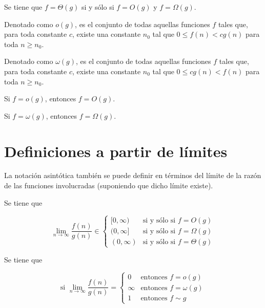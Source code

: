\begin{prop}
    Se tiene que $f=\Theta(g)$ si y sólo si $f=O(g)$ y $f=\Omega(g)$.
\end{prop}

\begin{defn}[o chica]
    Denotado como $o(g)$, es el conjunto de todas aquellas funciones
    $f$ tales que, para toda constante $c$, existe una constante $n_{0}$
    tal que $0\leq f(n)<c g(n)$ para toda $n\geq n_{0}$.
\end{defn}

\begin{defn}
    Denotado como $\omega(g)$, es el conjunto de todas aquellas funciones
    $f$ tales que, para toda constante $c$, existe una constante $n_{0}$
    tal que $0\leq c g(n)<f(n)$ para toda $n\geq n_{0}$.
\end{defn}

\begin{prop}
    Si $f=o(g)$, entonces $f=O(g)$.
\end{prop}

\begin{prop}
    Si $f=\omega(g)$, entonces $f=\Omega(g)$.
\end{prop}

\section{Definiciones a partir de límites}

La notación asintótica también se puede definir en términos del límite
de la razón de las funciones involucradas (suponiendo que dicho límite
existe). 

\begin{prop}
    Se tiene que
    
    \[
        \lim_{n\to\infty}\dfrac{f(n)}{g(n)}\in\begin{cases}
            [0,\infty) & \text{si y sólo si }f=O(g)\\
            (0,\infty] & \text{si y sólo si }f=\Omega(g)\\
            (0,\infty) & \text{si y sólo si }f=\Theta(g)
        \end{cases}
    \]
\end{prop}

\begin{prop}
    Se tiene que

    \[
        \text{si }\lim_{n\to\infty}\dfrac{f(n)}{g(n)}=\begin{cases}
        0 & \text{entonces }f=o(g)\\
        \infty & \text{entonces }f=\omega(g)\\
        1 & \text{entonces }f\sim g
        \end{cases}
    \]
\end{prop}

